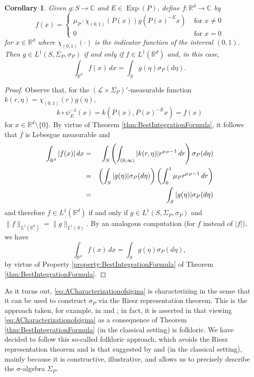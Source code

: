 \documentclass[11pt]{article}
\newtheorem{corollary}[theorem]{Corollary}
\theoremstyle{remark}
\newcommand\Exp{\operatorname{Exp}}
\begin{document}
\begin{corollary}\label{cor:IntegrateOnS}
Given $g:S\to\mathbb{C}$ and $E\in\Exp(P)$, define $f:\mathbb{R}^d\to\mathbb{C}$ by
\begin{equation*}
f(x)=\begin{cases}
\mu_P\cdot \chi_{(0,1)}(P(x))g(P(x)^{-E}x) & \mbox{ for }x\neq 0\\
0 & \mbox{ for }x=0
\end{cases}
\end{equation*}
for $x\in\mathbb{R}^d$ where $\chi_{(0,1)}(\cdot)$ is the indicator function of the interval $(0,1)$. Then $g\in L^1(S,\Sigma_P,\sigma_P)$ if and only if $f\in L^1(\mathbb{R}^d)$ and, in this case, 
\begin{equation}\label{eq:ACharacterizationofsigma}
    \int_{\mathbb{R}^d}f(x)\,dx=\int_Sg(\eta)\sigma_P(d\eta).
\end{equation}
\end{corollary}
\begin{proof}
Observe that, for the $(\mathcal{L}\times\Sigma_P)'$-measurable function $k(r,\eta)=\chi_{(0,1)}(r)g(\eta)$,
\begin{equation*}
    k\circ\psi_E^{-1}(x)=k(P(x),P(x)^{-E}x)=f(x)
\end{equation*}
for $x\in\mathbb{R}^d\setminus \{0\}$. By virtue of Theorem \ref{thm:BestIntegrationFormula}, it follows that $f$ is Lebesgue measurable and 
\begin{eqnarray*}
   \int_{\mathbb{R}^d}|f(x)|\,dx&=&\int_{S}\left(\int_{(0,\infty)}|k(r,\eta)|r^{\mu_P-1}\,dr\right)\sigma_P(d\eta)\\
    &=&\left(\int_S|g(\eta)|\sigma_P(d\eta)\right)\left(\int_0^1 \mu_Pr^{\mu_P-1}\,dr\right)\\
    &=&\int_S\abs{g(\eta)}\sigma_P(d\eta)
\end{eqnarray*}
and therefore $f\in L^1(\mathbb{R}^d)$ if and only if $g\in L^1(S,\Sigma_P,\sigma_P)$ and $\|f\|_{L^1(\mathbb{R}^d)}=\|g\|_{L^1(S)}$. By an analogous computation (for $f$ instead of $|f|$), we have
\begin{equation*}
    \int_{\mathbb{R}^d}f(x)\,dx=\int_S g(\eta)\sigma_P(d\eta),
\end{equation*}
by virtue of Property \ref{property:BestIntegrationFormula} of Theorem \ref{thm:BestIntegrationFormula}. 
\end{proof}

\noindent As it turns out, \eqref{eq:ACharacterizationofsigma} is characterizing in the sense that it can be used to construct $\sigma_P$ via the Riesz representation theorem. This is the approach taken, for example, in \cite{folland_hardy_1982} and \cite{baker_integration_1997}; in fact, it is asserted in \cite{baker_integration_1997} that viewing \eqref{eq:ACharacterizationofsigma} as a consequence of Theorem \ref{thm:BestIntegrationFormula} (in the classical setting) is folkloric. We have decided to follow this so-called folkloric approach, which avoids the Riesz representation theorem and is that suggested by \cite{rudin_real_1987} and \cite{folland_how_2001} (in the classical setting), mainly because it is constructive, illustrative, and allows us to precisely describe the $\sigma$-algebra $\Sigma_P$.\\
\end{document}
